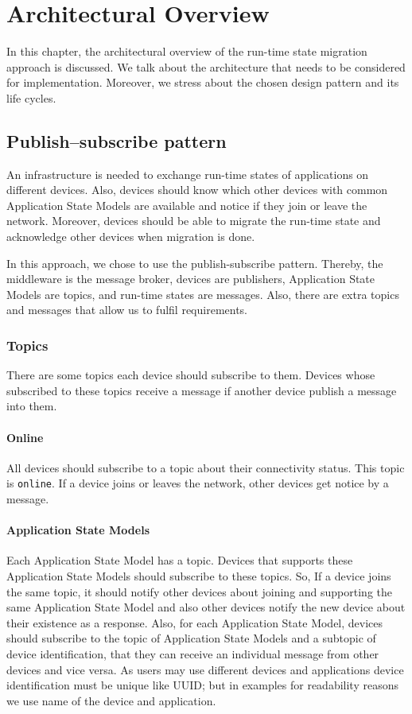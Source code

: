 \chapter{Architectural Overview}
\label{ch:architectural_overview}
In this chapter, the architectural overview of the run-time state migration approach is discussed. We talk about the architecture that needs to be considered for implementation. Moreover, we stress about the chosen design pattern and its life cycles.

\section{Publish–subscribe pattern}
An infrastructure is needed to exchange run-time states of applications on different devices. Also, devices should know which other devices with common Application State Models are available and notice if they join or leave the network. Moreover, devices should be able to migrate the run-time state and acknowledge other devices when migration is done.

In this approach, we chose to use the publish-subscribe pattern. Thereby, the middleware is the message broker, devices are publishers, Application State Models are topics, and run-time states are messages. Also, there are extra topics and messages that allow us to fulfil requirements. 

\subsection{Topics}
There are some topics each device should subscribe to them. Devices whose subscribed to these topics receive a message if another device publish a message into them.

\subsubsection{Online}
All devices should subscribe to a topic about their connectivity status. This topic is \lstinline[basicstyle=\ttfamily]{online}. If a device joins or leaves the network, other devices get notice by a message.

\subsubsection{Application State Models}
Each Application State Model has a topic. Devices that supports these Application State Models should subscribe to these topics. So, If a device joins the same topic, it should notify other devices about joining and supporting the same Application State Model and also other devices notify the new device about their existence as a response. Also, for each Application State Model, devices should subscribe to the topic of Application State Models and a subtopic of device identification, that they can receive an individual message from other devices and vice versa. As users may use different devices and applications device identification must be unique like UUID; but in examples for readability reasons we use name of the device and application.

